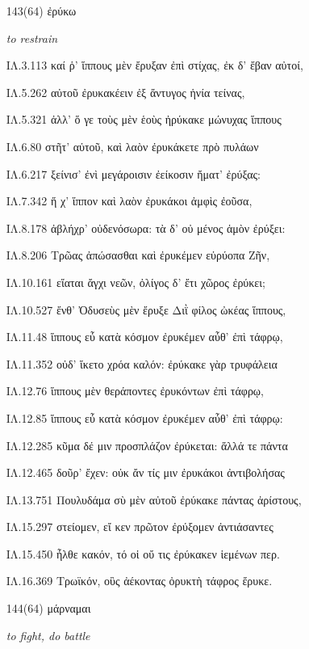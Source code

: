 \begin{enumerate}
{}

\clearpage
\item[\large 143(64)]{\large \g ἐρύκω	}

\hspace{0.2cm} \textit{ to restrain }

{\g
ΙΛ.3.113 καί ῥ' ἵππους μὲν ἔρυξαν ἐπὶ στίχας, ἐκ δ' ἔβαν αὐτοί,

ΙΛ.5.262 αὐτοῦ ἐρυκακέειν ἐξ ἄντυγος ἡνία τείνας,

ΙΛ.5.321 ἀλλ' ὅ γε τοὺς μὲν ἑοὺς ἠρύκακε μώνυχας ἵππους

ΙΛ.6.80 στῆτ' αὐτοῦ, καὶ λαὸν ἐρυκάκετε πρὸ πυλάων

ΙΛ.6.217 ξείνισ' ἐνὶ μεγάροισιν ἐείκοσιν ἤματ' ἐρύξας:

ΙΛ.7.342 ἥ χ' ἵππον καὶ λαὸν ἐρυκάκοι ἀμφὶς ἐοῦσα,

ΙΛ.8.178 ἀβλήχρ' οὐδενόσωρα: τὰ δ' οὐ μένος ἁμὸν ἐρύξει:

ΙΛ.8.206 Τρῶας ἀπώσασθαι καὶ ἐρυκέμεν εὐρύοπα Ζῆν,

ΙΛ.10.161 εἵαται ἄγχι νεῶν, ὀλίγος δ' ἔτι χῶρος ἐρύκει;

ΙΛ.10.527 ἔνθ' Ὀδυσεὺς μὲν ἔρυξε Διῒ φίλος ὠκέας ἵππους,

ΙΛ.11.48 ἵππους εὖ κατὰ κόσμον ἐρυκέμεν αὖθ' ἐπὶ τάφρῳ,

ΙΛ.11.352 οὐδ' ἵκετο χρόα καλόν: ἐρύκακε γὰρ τρυφάλεια

ΙΛ.12.76 ἵππους μὲν θεράποντες ἐρυκόντων ἐπὶ τάφρῳ,

ΙΛ.12.85 ἵππους εὖ κατὰ κόσμον ἐρυκέμεν αὖθ' ἐπὶ τάφρῳ:

ΙΛ.12.285 κῦμα δέ μιν προσπλάζον ἐρύκεται: ἄλλά τε πάντα

ΙΛ.12.465 δοῦρ' ἔχεν: οὐκ ἄν τίς μιν ἐρυκάκοι ἀντιβολήσας

ΙΛ.13.751 Πουλυδάμα σὺ μὲν αὐτοῦ ἐρύκακε πάντας ἀρίστους,

ΙΛ.15.297 στείομεν, εἴ κεν πρῶτον ἐρύξομεν ἀντιάσαντες

ΙΛ.15.450 ἦλθε κακόν, τό οἱ οὔ τις ἐρύκακεν ἱεμένων περ.

ΙΛ.16.369 Τρωϊκόν, οὓς ἀέκοντας ὀρυκτὴ τάφρος ἔρυκε.

}

\clearpage
\item[\large 144(64)]{\large \g μάρναμαι	}

\hspace{0.2cm} \textit{ to fight, do battle }


\end{enumerate}
